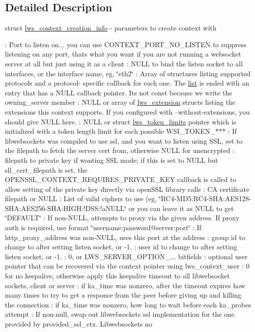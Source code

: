 \subsection{Detailed Description}
struct \hyperlink{structlws__context__creation__info}{lws\+\_\+context\+\_\+creation\+\_\+info} -\/ parameters to create context with

\+: Port to listen on... you can use C\+O\+N\+T\+E\+X\+T\+\_\+\+P\+O\+R\+T\+\_\+\+N\+O\+\_\+\+L\+I\+S\+T\+EN to suppress listening on any port, that\textquotesingle{}s what you want if you are not running a websocket server at all but just using it as a client \+: N\+U\+LL to bind the listen socket to all interfaces, or the interface name, eg, \char`\"{}eth2\char`\"{} \+: Array of structures listing supported protocols and a protocol-\/ specific callback for each one. The \hyperlink{protocollist-p}{list} is ended with an entry that has a N\+U\+LL callback pointer. It\textquotesingle{}s not const because we write the owning\+\_\+server member \+: N\+U\+LL or array of \hyperlink{structlws__extension}{lws\+\_\+extension} structs listing the extensions this context supports. If you configured with --without-\/extensions, you should give N\+U\+LL here. \+: N\+U\+LL or struct \hyperlink{structlws__token__limits}{lws\+\_\+token\+\_\+limits} pointer which is initialized with a token length limit for each possible W\+S\+I\+\_\+\+T\+O\+K\+E\+N\+\_\+$\ast$$\ast$$\ast$ \+: If libwebsockets was compiled to use ssl, and you want to listen using S\+SL, set to the filepath to fetch the server cert from, otherwise N\+U\+LL for unencrypted \+: filepath to private key if wanting S\+SL mode; if this is set to N\+U\+LL but sll\+\_\+cert\+\_\+filepath is set, the O\+P\+E\+N\+S\+S\+L\+\_\+\+C\+O\+N\+T\+E\+X\+T\+\_\+\+R\+E\+Q\+U\+I\+R\+E\+S\+\_\+\+P\+R\+I\+V\+A\+T\+E\+\_\+\+K\+EY callback is called to allow setting of the private key directly via open\+S\+SL library calls \+: CA certificate filepath or N\+U\+LL \+: List of valid ciphers to use (eg, \char`\"{}\+R\+C4-\/\+M\+D5\+:\+R\+C4-\/\+S\+H\+A\+:\+A\+E\+S128-\/\+S\+H\+A\+:\+A\+E\+S256-\/\+S\+H\+A\+:\+H\+I\+G\+H\+:!\+D\+S\+S\+:!a\+N\+U\+L\+L\char`\"{} or you can leave it as N\+U\+LL to get \char`\"{}\+D\+E\+F\+A\+U\+L\+T\char`\"{} \+: If non-\/\+N\+U\+LL, attempts to proxy via the given address. If proxy auth is required, use format \char`\"{}username\+:password@server\+:port\char`\"{} \+: If http\+\_\+proxy\+\_\+address was non-\/\+N\+U\+LL, uses this port at the address \+: group id to change to after setting listen socket, or -\/1. \+: user id to change to after setting listen socket, or -\/1. \+: 0, or L\+W\+S\+\_\+\+S\+E\+R\+V\+E\+R\+\_\+\+O\+P\+T\+I\+O\+N\+\_\+... bitfields \+: optional user pointer that can be recovered via the context pointer using lws\+\_\+context\+\_\+user \+: 0 for no keepalive, otherwise apply this keepalive timeout to all libwebsocket sockets, client or server \+: if ka\+\_\+time was nonzero, after the timeout expires how many times to try to get a response from the peer before giving up and killing the connection \+: if ka\+\_\+time was nonzero, how long to wait before each ka\+\_\+probes attempt \+: If non-\/null, swap out libwebsockets ssl implementation for the one provided by provided\+\_\+ssl\+\_\+ctx. Libwebsockets no 
